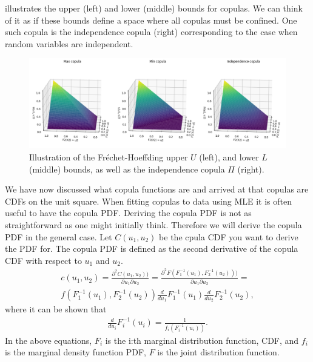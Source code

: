  illustrates the upper (left) and lower (middle) bounds for copulas. We can think of it as if these bounds define a space where all copulas must be confined. One such copula is the independence copula (right) corresponding to the case when random variables are independent. 

\begin{figure}
    \centering
    \includegraphics[width=1.\linewidth]{3Theory/pictures/FrechetBounds.png}
    \caption{Illustration of the Fréchet-Hoeffding upper $U$ (left), and lower $L$ (middle) bounds, as well as the independence copula $\Pi$ (right).}
    \label{fig:FrechetBounds}
\end{figure}

We have now discussed what copula functions are and arrived at that copulas are \gls{CDF}s on the unit square. When fitting copulas to data using \gls{MLE} it is often useful to have the copula \gls{PDF}. Deriving the copula \gls{PDF} is not as straightforward as one might initially think. Therefore we will derive the copula \gls{PDF} in the general case. Let $C(u_1,u_2)$ be the cpula \gls{CDF} you want to derive the \gls{PDF} for. The copula \gls{PDF} is defined as the second derivative of the copula \gls{CDF} with respect to $u_1$ and $u_2$.
\begin{align*}
    c(u_1,u_2) = \frac{\partial^2C(u_1,u_2))}{\partial u_1\partial u_2} = 
    \frac{\partial^2F(F_1^{-1}(u_1),F_2^{-1}(u_2)))}{\partial u_1\partial u_2}
    = \\ f(F_1^{-1}(u_1),F_2^{-1}(u_2)) \frac{d}{du_1} F_1^{-1}(u_1)  \frac{d}{du_2} F_2^{-1}(u_2),
\end{align*}
where it can be shown that 
\begin{align*}
    \frac{d}{du_i} F_i^{-1}(u_i) = \frac{1}{f_i(F_i^{-1}(u_i))}.
\end{align*}
In the above equations, $F_i$ is the i:th marginal distribution function, \gls{CDF}, and $f_i$ is the marginal density function \gls{PDF}, $F$ is the joint distribution function.   

